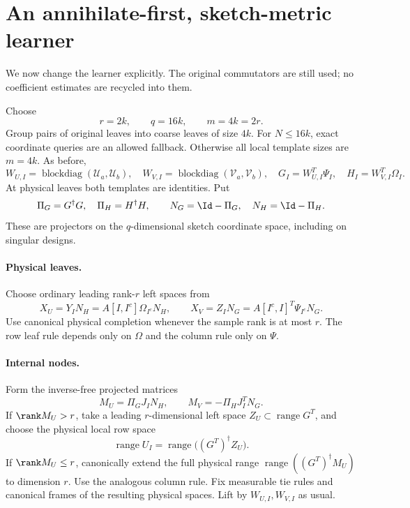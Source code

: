 \documentclass[11pt,oneside,openany,a4paper]{book}
\numberwithin{equation}{chapter}
\theoremstyle{definition}
\theoremstyle{remark}
\DeclareMathOperator{\diag}{blockdiag}\DeclareMathOperator{\range}{range}
\DeclareMathOperator{\ran}{range}\DeclareMathOperator{\OPT}{OPT}
\begin{document}
\section{An annihilate-first, sketch-metric learner}
We now change the learner explicitly. The original commutators are still used; no coefficient estimates are recycled into them.

Choose
\begin{equation}\label{actual:eq:newparams}
 r=2k,\qquad q=16k,\qquad m=4k=2r.
\end{equation}
Group pairs of original leaves into coarse leaves of size $4k$. For $N\le16k$, exact coordinate queries are an allowed fallback. Otherwise all local template sizes are $m=4k$. As before,
\[
 W_{U,I}=\diag(\mathcal U_a,\mathcal U_b),\quad
 W_{V,I}=\diag(\mathcal V_a,\mathcal V_b),\quad
 G_I=W_{U,I}^T\Psi_I,\quad H_I=W_{V,I}^T\Omega_I.
\]
At physical leaves both templates are identities. Put
\[
 \Pi_G=G^\dagger G,\quad\Pi_H=H^\dagger H,
 \qquad N_G=\Id-\Pi_G,\quad N_H=\Id-\Pi_H.
\]
These are projectors on the $q$-dimensional sketch coordinate space, including on singular designs.

\paragraph{Physical leaves.}
Choose ordinary leading rank-$r$ left spaces from
\begin{equation}\label{actual:eq:leafalgo}
 X_U=Y_I N_H=A[I,I^c]\Omega_{I^c}N_H,\qquad
 X_V=Z_I N_G=A[I^c,I]^T\Psi_{I^c}N_G.
\end{equation}
Use canonical physical completion whenever the sample rank is at most $r$. The row leaf rule depends only on $\Omega$ and the column rule only on $\Psi$.

\paragraph{Internal nodes.}
Form the inverse-free projected matrices
\begin{equation}\label{actual:eq:metricdata}
 M_U=\Pi_G J_I N_H,\qquad M_V=-\Pi_HJ_I^T N_G.
\end{equation}
If $\rank M_U>r$, take a leading $r$-dimensional left space $Z_U\subset\ran G^T$, and choose the physical local row space
\begin{equation}\label{actual:eq:lift}
 \ran U_I=\ran\bigl((G^T)^\dagger Z_U\bigr).
\end{equation}
If $\rank M_U\le r$, canonically extend the full physical range
$\ran((G^T)^\dagger M_U)$ to dimension $r$. Use the analogous column rule. Fix measurable tie rules and canonical frames of the resulting physical spaces. Lift by $W_{U,I},W_{V,I}$ as usual.
\end{document}
